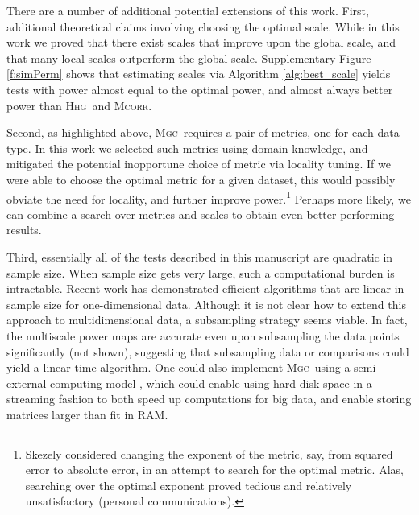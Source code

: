 \documentclass[11pt]{article}
\providecommand{\sct}[1]{{\normalfont\textsc{#1}}}
\newcommand{\Mgc}{\sct{Mgc}}
\newcommand{\Hhg}{\sct{Hhg}}
\newcommand{\Mcorr}{\sct{Mcorr}}
\begin{document}
There are a number of additional potential extensions of this work.  First, additional theoretical claims involving choosing the optimal scale. 
While in this work we proved that there exist scales that improve upon the global scale, and that many local scales outperform the global scale.
Supplementary Figure \ref{f:simPerm} shows that estimating scales via Algorithm \ref{alg:best_scale} yields tests with power almost equal to the optimal power, and almost always better power than \Hhg~and \Mcorr.  



Second, as highlighted above, \Mgc~requires a pair of metrics, one for each data type. In this work we selected such metrics using domain knowledge, and mitigated the potential inopportune choice of metric via locality tuning.  If we were able to choose the optimal metric for a given dataset, this would possibly obviate the need for locality, and further improve power.\footnote{Skezely considered changing the exponent of the metric, say, from squared error to absolute error, in an attempt to search for the optimal metric. Alas, searching over the optimal exponent proved tedious and relatively unsatisfactory (personal communications).  }
Perhaps more likely, we can combine a search over metrics and scales to obtain even better performing results. 

Third, essentially all of the tests described in this manuscript are quadratic in sample size.  When sample size gets very large, such a computational burden is intractable.  Recent work has demonstrated efficient algorithms that are linear in sample size \cite{Huo2016} for one-dimensional data.  Although it is not clear how to extend this approach to multidimensional data, a subsampling strategy seems viable.  In fact, the multiscale power maps are accurate even upon subsampling the data points significantly (not shown), suggesting that subsampling data or comparisons  could yield a linear time algorithm.  One could also implement \Mgc~using a semi-external computing model \cite{Zheng2016},  which could enable using hard disk space in a streaming fashion to both speed up computations for big data, and enable storing matrices larger than fit in RAM.
\end{document}

